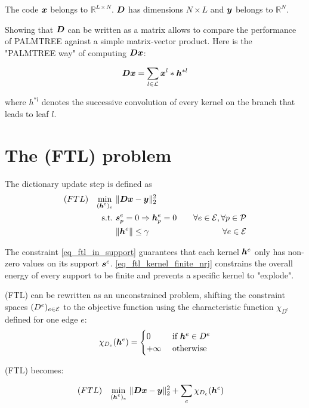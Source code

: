 The code $\bm x$ belongs to $\mathbb{R}^{L\times N}$. $\bm D$ has dimensions $N \times L$ and $\bm y$ belongs to $\mathbb{R}^N$. 

Showing that $\bm D$ can be written as a matrix allows to compare the performance of PALMTREE against a simple matrix-vector product. Here is the "PALMTREE way" of computing $\bm D\bm x$:

\begin{align}
	\bm D\bm x = \sum_{l \in \mathcal L} \bm x^l * \bm h^{*l}	 \label{eq_Dx_as_convolution}
\end{align}

where $h^{*l}$ denotes the successive convolution of every kernel on the branch that leads to leaf $l$.



\section{The (FTL) problem}

The dictionary update step is defined as 
\begin{align}
(FTL) \quad \underset{\substack{(\bm h^e)_{e}}}\min ~ & \lVert \bm D\bm x - \bm y \rVert_2^2 \label{eq_ftl_energy}\\
\text{s.t.~} & \bm s^e_p=0 \Rightarrow \bm h^e_p = 0 \quad & \forall e \in \mathcal E, \forall p \in \mathcal P \label{eq_ftl_in_support} \\
 & \lVert \bm h^e \rVert \le \gamma & \forall e \in \mathcal E\label{eq_ftl_kernel_finite_nrj}
\end{align}

The constraint \ref{eq_ftl_in_support} guarantees that each kernel $\bm h^e$ only has non-zero values on its support $\bm s^e$. \ref{eq_ftl_kernel_finite_nrj} constrains the overall energy of every support to be finite and prevents a specific kernel to "explode".

(FTL) can be rewritten as an unconstrained problem, shifting the constraint spaces $(D^e)_{e \in \mathcal E}$ to the objective function using the characteristic function $\chi_{D^e}$ defined for one edge $e$:
$$\chi_{D_e}(\h^e) = \begin{cases} 0 &\text{ if } \h^e \in D^e \\ +\infty & \ \text{otherwise}\end{cases}$$

(FTL) becomes:

\begin{align}
(FTL) \quad \underset{\substack{(\bm h^e)_{e}}}\min ~ & \lVert \bm D\bm x - \bm y \rVert_2^2 + \sum_{e}\chi_{D_e} (\bm h^e)
\end{align}

